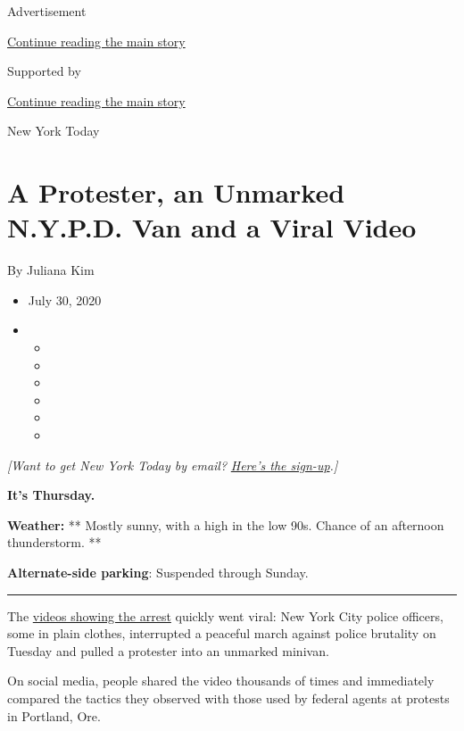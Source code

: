 Advertisement

\protect\hyperlink{after-top}{Continue reading the main story}

Supported by

\protect\hyperlink{after-sponsor}{Continue reading the main story}

New York Today

\hypertarget{a-protester-an-unmarked-nypd-van-and-a-viral-video}{%
\section{A Protester, an Unmarked N.Y.P.D. Van and a Viral
Video}\label{a-protester-an-unmarked-nypd-van-and-a-viral-video}}

By Juliana Kim

\begin{itemize}
\item
  July 30, 2020
\item
  \begin{itemize}
  \item
  \item
  \item
  \item
  \item
  \item
  \end{itemize}
\end{itemize}

\emph{{[}Want to get New York Today by email?}
\href{https://www.nytimes3xbfgragh.onion/newsletters/newyorktoday}{\emph{Here's
the sign-up}}\emph{.{]}}

\textbf{It's Thursday.}

\textbf{Weather:} ** Mostly sunny, with a high in the low 90s. Chance of
an afternoon thunderstorm. **

\textbf{Alternate-side parking}: Suspended through Sunday.

\begin{center}\rule{0.5\linewidth}{\linethickness}\end{center}

The
\href{https://twitter.com/Naddleez/status/1288232816451432453}{videos
showing the arrest} quickly went viral: New York City police officers,
some in plain clothes, interrupted a peaceful march against police
brutality on Tuesday and pulled a protester into an unmarked minivan.

On social media, people shared the video thousands of times and
immediately compared the tactics they observed with those used by
federal agents at protests in Portland, Ore.


